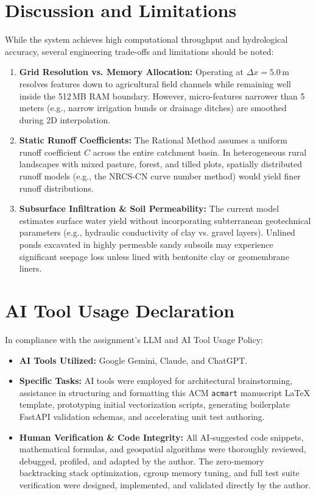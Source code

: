 \documentclass[manuscript,screen,review]{acmart}
\begin{document}
\section{Discussion and Limitations}
\label{sec:discussion}
While the system achieves high computational throughput and hydrological accuracy, several engineering trade-offs and limitations should be noted:
\begin{enumerate}
    \item \textbf{Grid Resolution vs. Memory Allocation:} Operating at $\Delta x = 5.0$\,m resolves features down to agricultural field channels while remaining well inside the 512\,MB RAM boundary. However, micro-features narrower than 5 meters (e.g., narrow irrigation bunds or drainage ditches) are smoothed during 2D interpolation.
    \item \textbf{Static Runoff Coefficients:} The Rational Method assumes a uniform runoff coefficient $C$ across the entire catchment basin. In heterogeneous rural landscapes with mixed pasture, forest, and tilled plots, spatially distributed runoff models (e.g., the NRCS-CN curve number method) would yield finer runoff distributions.
    \item \textbf{Subsurface Infiltration \& Soil Permeability:} The current model estimates surface water yield without incorporating subterranean geotechnical parameters (e.g., hydraulic conductivity of clay vs. gravel layers). Unlined ponds excavated in highly permeable sandy subsoils may experience significant seepage loss unless lined with bentonite clay or geomembrane liners.
\end{enumerate}

\section{AI Tool Usage Declaration}
\label{sec:ai-usage}
In compliance with the assignment's LLM and AI Tool Usage Policy:
\begin{itemize}
    \item \textbf{AI Tools Utilized:} Google Gemini, Claude, and ChatGPT.
    \item \textbf{Specific Tasks:} AI tools were employed for architectural brainstorming, assistance in structuring and formatting this ACM \texttt{acmart} manuscript LaTeX template, prototyping initial vectorization scripts, generating boilerplate FastAPI validation schemas, and accelerating unit test authoring.
    \item \textbf{Human Verification \& Code Integrity:} All AI-suggested code snippets, mathematical formulas, and geospatial algorithms were thoroughly reviewed, debugged, profiled, and adapted by the author. The zero-memory backtracking stack optimization, cgroup memory tuning, and full test suite verification were designed, implemented, and validated directly by the author.
\end{itemize}
\end{document}
